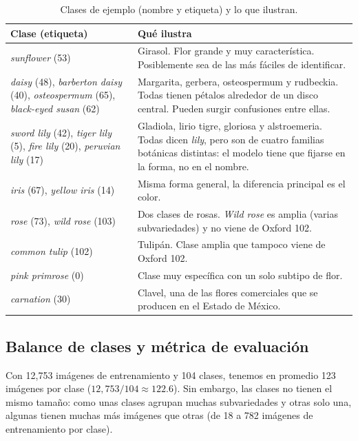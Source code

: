 \begin{table}[htbp]
\centering
\caption{Clases de ejemplo (nombre y etiqueta) y lo que ilustran.}
\label{tab:ejemplos}
\small
\begin{tabular}{p{}p{}}
\toprule
Clase (etiqueta) & Qué ilustra \\
\midrule
\textit{sunflower} (53) & Girasol. Flor grande y muy característica. Posiblemente sea de las más fáciles de identificar. \\
\textit{daisy} (48), \textit{barberton daisy} (40), \textit{osteospermum} (65), \textit{black-eyed susan} (62) & Margarita, gerbera, osteospermum y rudbeckia. Todas tienen pétalos alrededor de un disco central. Pueden surgir confusiones entre ellas. \\
\textit{sword lily} (42), \textit{tiger lily} (5), \textit{fire lily} (20), \textit{peruvian lily} (17) & Gladiola, lirio tigre, gloriosa y alstroemeria. Todas dicen \textit{lily}, pero son de cuatro familias botánicas distintas: el modelo tiene que fijarse en la forma, no en el nombre. \\
\textit{iris} (67), \textit{yellow iris} (14) & Misma forma general, la diferencia principal es el color. \\
\textit{rose} (73), \textit{wild rose} (103) & Dos clases de rosas. \textit{Wild rose} es amplia (varias subvariedades) y no viene de Oxford 102. \\
\textit{common tulip} (102) & Tulipán. Clase amplia que tampoco viene de Oxford 102. \\
\textit{pink primrose} (0) & Clase muy específica con un solo subtipo de flor. \\
\textit{carnation} (30) & Clavel, una de las flores comerciales que se producen en el Estado de México. \\
\bottomrule
\end{tabular}
\end{table}

\subsection{Balance de clases y métrica de evaluación}
Con 12,753 imágenes de entrenamiento y 104 clases, tenemos en promedio 123 imágenes por clase ($12{,}753/104 \approx 122.6$). Sin embargo, las clases no tienen el mismo tamaño: como unas clases agrupan muchas subvariedades y otras solo una, algunas tienen muchas más imágenes que otras (de 18 a 782 imágenes de entrenamiento por clase).

